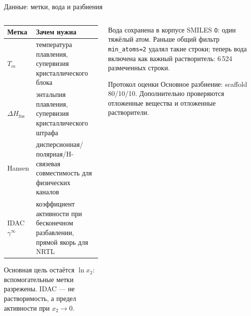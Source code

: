 \documentclass[aspectratio=169,10pt]{beamer}
\newcommand{\smallnote}[1]{{\scriptsize\color{TGSlate}#1}}
\begin{document}
\begin{frame}{Данные: метки, вода и разбиения}
  \small
  \begin{columns}[T,onlytextwidth]
    \begin{column}{0.58\textwidth}
      \scriptsize
      \begin{tabularx}{\linewidth}{lY}
        \toprule
        \textbf{Метка} & \textbf{Зачем нужна}\\
        \midrule
        $T_m$ & температура плавления, супервизия кристаллического блока\\
        $\Delta H_{\mathrm{fus}}$ & энтальпия плавления, супервизия кристаллического штрафа\\
        Hansen & дисперсионная/полярная/H-связевая совместимость для физических каналов\\
        IDAC $\gamma^\infty$ & коэффициент активности при бесконечном разбавлении, прямой якорь для NRTL\\
        \bottomrule
      \end{tabularx}
      \vspace{0.35em}
      \smallnote{Основная цель остаётся $\ln x_2$: вспомогательные метки разрежены. IDAC — не растворимость, а предел активности при $x_2\to0$.}
    \end{column}
    \begin{column}{0.38\textwidth}
      \begin{block}{Вода сохранена в корпусе}
        \scriptsize
        SMILES \texttt{O}: один тяжёлый атом. Раньше общий фильтр \texttt{min\_atoms=2} удалял такие строки; теперь вода включена как важный растворитель: 6\,524 размеченных строки.
      \end{block}
      \begin{block}{Протокол оценки}
        \scriptsize
        Основное разбиение: scaffold 80/10/10. Дополнительно проверяются отложенные вещества и отложенные растворители.
      \end{block}
    \end{column}
  \end{columns}
\end{frame}
\end{document}
